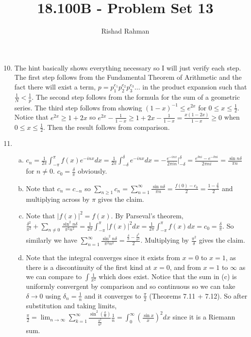 \documentclass{article}
\begin{document}
\setlength{\abovedisplayskip}{0pt}
\setlength{\belowdisplayskip}{0pt}
\setlength{\abovedisplayshortskip}{0pt}
\setlength{\belowdisplayshortskip}{0pt}
\title{18.100B - Problem Set 13}
\author{Rishad Rahman}
\date{}
\maketitle
\begin{enumerate}
\setcounter{enumi}{9}
\item The hint basically shows everything necessary so I will just verify each step. The first step follows from the Fundamental Theorem of Arithmetic and the fact there will exist a term, $p=p_1^{e_1}p_2^{e_2}p_3^{e_3}...$ in the product expansion such that $\frac{1}{N} < \frac{1}{p}$. The second step follows from the formula for the sum of a geometric series. The third step follows from showing $(1-x)^{-1} \leq e^{2x}$ for $0\leq x \leq \frac{1}{2}$. Notice that $e^{2x} \geq 1+2x$ so $e^{2x} - \frac{1}{1-x} \geq 1+2x - \frac{1}{1-x} = \frac{x(1-2x)}{1-x} \geq 0$ when $0\leq x \leq \frac{1}{2}$. Then the result follows from comparison. \\
\setcounter{enumi}{11}
\item
\begin{enumerate}[(a)]
\item $c_n = \displaystyle \frac{1}{2\pi} \int_{-\pi}^{\pi} f(x) e^{-inx} dx = \frac{1}{2\pi} \int_{-\delta}^{\delta} e^{-inx} dx = -\frac{e^{-inx}}{2\pi in} \bigg|_{-\delta}^{\delta}=\frac{e^{\delta n i} - e^{ -\delta n i}}{2\pi n i}=\frac{\sin{n\delta}}{\pi n}$ for $n\neq 0$. $c_0=\frac{\delta}{\pi}$ obviously.\\
\item Note that $c_n = c_{-n}$ so $\displaystyle\sum_{n\geq 1} c_n =\sum_{n=1}^{\infty} \frac{\sin{n\delta}}{\pi n}= \frac{f(0)-c_0}{2} = \frac{1-\frac{\delta}{\pi}}{2}$ and multiplying across by $\pi$ gives the claim.\\
\item Note that $|f(x)|^2=f(x)$. By Parseval's theorem, $\displaystyle\frac{\delta^2}{\pi^2} +\sum_{n \neq 0}^{} \frac{\sin^2 n\delta}{\pi^2 n^2} = \frac{1}{2\pi} \int_{-\pi}^{\pi} |f(x)|^2 dx = \frac{1}{2\pi} \int_{-\pi}^{\pi} f(x) dx = c_0 = \frac{\delta}{\pi}$. So similarly we have $\displaystyle\sum_{n=1}^{\infty} \frac{\sin^2 n\delta}{\pi^2 n^2} = \frac{\frac{\delta}{\pi}-\frac{\delta^2}{\pi^2}}{2}$. Multiplying by $\displaystyle\frac{\pi^2}{\delta}$ gives the claim.\\
\item Note that the integral converges since it exists from $x=0$ to $x=1$, as there is a discontinuity of the first kind at $x=0$, and from $x=1$ to $\infty$ as we can compare to $\int \frac{1}{x^2}$ which does exist. Notice that the sum in (c) is uniformly convergent by comparison and so continuous so we can take $\delta\rightarrow 0$ using $\delta_n = \frac{1}{n}$ and it converges to $\frac{\pi}{2}$ (Theorems 7.11 + 7.12). So after substitution and taking limits,$\displaystyle \frac{\pi}{2} = \lim_{n\rightarrow\infty} \sum_{k=1}^{\infty} \frac{\sin^2 (\frac{k}{n})}{\frac{k^2}{n^2}} \frac{1}{n} = \int_{0}^{\infty} \left(\frac{\sin x}{x}\right)^2 dx$ since it is a Riemann sum. \\

\end{enumerate}
\end{enumerate}
\end{document}
